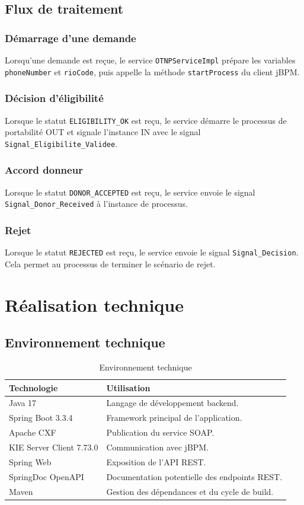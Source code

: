 \documentclass[12pt,a4paper]{report}
\begin{document}
\section{Flux de traitement}
\subsection{Démarrage d'une demande}
Lorsqu'une demande est reçue, le service \texttt{OTNPServiceImpl} prépare les variables \texttt{phoneNumber} et \texttt{rioCode}, puis appelle la méthode \texttt{startProcess} du client jBPM.

\subsection{Décision d'éligibilité}
Lorsque le statut \texttt{ELIGIBILITY\_OK} est reçu, le service démarre le processus de portabilité OUT et signale l'instance IN avec le signal \texttt{Signal\_Eligibilite\_Validee}.

\subsection{Accord donneur}
Lorsque le statut \texttt{DONOR\_ACCEPTED} est reçu, le service envoie le signal \texttt{Signal\_Donor\_Received} à l'instance de processus.

\subsection{Rejet}
Lorsque le statut \texttt{REJECTED} est reçu, le service envoie le signal \texttt{Signal\_Decision}. Cela permet au processus de terminer le scénario de rejet.

\chapter{Réalisation technique}
\section{Environnement technique}
\begin{table}[h]
    \centering
    \begin{tabular}{p{4cm}p{8cm}}
        \toprule
        \textbf{Technologie} & \textbf{Utilisation} \\
        \midrule
        Java 17 & Langage de développement backend. \\
        Spring Boot 3.3.4 & Framework principal de l'application. \\
        Apache CXF & Publication du service SOAP. \\
        KIE Server Client 7.73.0 & Communication avec jBPM. \\
        Spring Web & Exposition de l'API REST. \\
        SpringDoc OpenAPI & Documentation potentielle des endpoints REST. \\
        Maven & Gestion des dépendances et du cycle de build. \\
        \bottomrule
    \end{tabular}
    \caption{Environnement technique}
\end{table}
\end{document}

